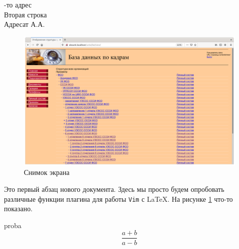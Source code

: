 \documentclass[a4paper]{article}
\begin{document}
\hfill
\parbox{75mm}{-то адрес\\Вторая строка\\[3mm]Адресат А.А.}
	
\begin{figure}[t]
	\centering
	\includegraphics[width=\textwidth]{Screenshot.png}
	\caption{Снимок экрана}
	\label{fig:screenshot}
\end{figure}

Это первый абзац нового документа. Здесь мы просто будем опробовать различные функции 
плагина для работы \texttt{Vim} с \LaTeX.
На рисунке \ref{fig:screenshot} что-то показано. 

proba 
$$\frac{a+b}{a-b}$$
\end{document}
